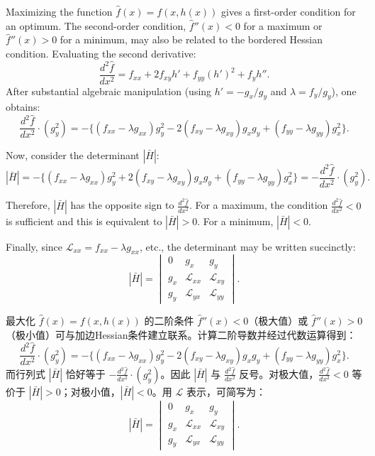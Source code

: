 \begin{original}
Maximizing the function $\hat{f}(x) = f(x, h(x))$ gives a first-order condition for an optimum. The second-order condition, $\hat{f}''(x) < 0$ for a maximum or $\hat{f}''(x) > 0$ for a minimum, may also be related to the bordered Hessian condition. Evaluating the second derivative:
\[
\frac{d^2\hat{f}}{dx^2} = f_{xx} + 2f_{xy}h' + f_{yy}(h')^2 + f_y h''.
\]
After substantial algebraic manipulation (using $h' = -g_x/g_y$ and $\lambda = f_y/g_y$), one obtains:
\[
\frac{d^2\hat{f}}{dx^2} \cdot (g_y^2) = -\{(f_{xx} - \lambda g_{xx})g_y^2 - 2(f_{xy} - \lambda g_{xy})g_x g_y + (f_{yy} - \lambda g_{yy})g_x^2\}.
\]

Now, consider the determinant $|\bar{H}|$:
\[
|\bar{H}| = -\{(f_{xx} - \lambda g_{xx})g_y^2 + 2(f_{xy} - \lambda g_{xy})g_x g_y + (f_{yy} - \lambda g_{yy})g_x^2\}
= -\frac{d^2\hat{f}}{dx^2} \cdot (g_y^2).
\]

Therefore, $|\bar{H}|$ has the opposite sign to $\frac{d^2\hat{f}}{dx^2}$. For a maximum, the condition $\frac{d^2\hat{f}}{dx^2} < 0$ is sufficient and this is equivalent to $|\bar{H}| > 0$. For a minimum, $|\bar{H}| < 0$.

Finally, since $\mathcal{L}_{xx} = f_{xx} - \lambda g_{xx}$, etc., the determinant may be written succinctly:
\[
|\bar{H}| = \begin{vmatrix}
0 & g_x & g_y \\
g_x & \mathcal{L}_{xx} & \mathcal{L}_{xy} \\
g_y & \mathcal{L}_{yx} & \mathcal{L}_{yy}
\end{vmatrix}.
\]
\end{original}
\begin{translation}
最大化 $\hat{f}(x) = f(x, h(x))$ 的二阶条件 $\hat{f}''(x) < 0$（极大值）或 $\hat{f}''(x) > 0$（极小值）可与加边Hessian条件建立联系。计算二阶导数并经过代数运算得到：
\[
\frac{d^2\hat{f}}{dx^2} \cdot (g_y^2) = -\{(f_{xx} - \lambda g_{xx})g_y^2 - 2(f_{xy} - \lambda g_{xy})g_x g_y + (f_{yy} - \lambda g_{yy})g_x^2\}.
\]
而行列式 $|\bar{H}|$ 恰好等于 $-\frac{d^2\hat{f}}{dx^2} \cdot (g_y^2)$。因此 $|\bar{H}|$ 与 $\frac{d^2\hat{f}}{dx^2}$ 反号。对极大值，$\frac{d^2\hat{f}}{dx^2} < 0$ 等价于 $|\bar{H}| > 0$；对极小值，$|\bar{H}| < 0$。用 $\mathcal{L}$ 表示，可简写为：
\[
|\bar{H}| = \begin{vmatrix}
0 & g_x & g_y \\
g_x & \mathcal{L}_{xx} & \mathcal{L}_{xy} \\
g_y & \mathcal{L}_{yx} & \mathcal{L}_{yy}
\end{vmatrix}.
\]
\end{translation}

